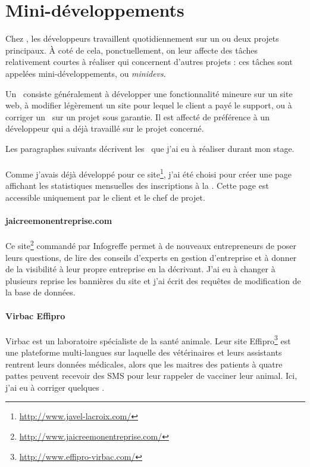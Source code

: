 \section{Mini-développements}
\label{minidev}

Chez \asl, les développeurs travaillent quotidiennement sur un ou deux projets principaux. À coté de cela, ponctuellement, on leur affecte des tâches relativement courtes à réaliser qui concernent d'autres projets : ces tâches sont appelées mini-développements, ou \emph{minidevs}.

Un \aminidev\ consiste généralement à développer une fonctionnalité mineure sur un site web, à modifier légèrement un site pour lequel le client a payé le support, ou à corriger un \abug\ sur un projet sous garantie. Il est affecté de préférence à un développeur qui a déjà travaillé sur le projet concerné. 

Les paragraphes suivants décrivent les \aminidevs\ que j'ai eu à réaliser durant mon stage.

\paragraph{\alc} Comme j'avais déjà développé pour ce site\footnote{\url{http://www.javel-lacroix.com/}}, j'ai été choisi pour créer une page affichant les statistiques mensuelles des inscriptions à la \anewsletter. Cette page est accessible uniquement par le client et le chef de projet.

\paragraph{jaicreemonentreprise.com} Ce site\footnote{\url{http://www.jaicreemonentreprise.com/}} commandé par Infogreffe permet à de nouveaux entrepreneurs de poser leurs questions, de lire des conseils d'experts en gestion d'entreprise et à donner de la visibilité à leur propre entreprise en la décrivant. J'ai eu à changer à plusieurs reprise les bannières du site et j'ai écrit des requêtes de modification de la base de données.

\paragraph{Virbac Effipro} Virbac est un laboratoire spécialiste de la santé animale. Leur site Effipro\footnote{\url{http://www.effipro-virbac.com/}} est une plateforme multi-langues sur laquelle des vétérinaires et leurs assistants rentrent leurs données médicales, alors que les maitres des patients à quatre pattes peuvent recevoir des SMS pour leur rappeler de vacciner leur animal. Ici, j'ai eu à corriger quelques \abugs.

